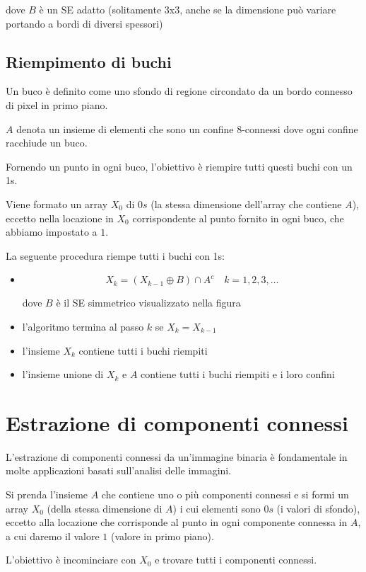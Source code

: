 dove $B$ è un SE adatto (solitamente 3x3, anche se la dimensione può variare portando a bordi di diversi spessori)

\subsection{Riempimento di buchi}
Un buco è definito come uno sfondo di regione circondato da un bordo connesso di pixel in primo piano.

$A$ denota un insieme di elementi che sono un confine 8-connessi dove ogni confine racchiude un buco.

Fornendo un punto in ogni buco, l'obiettivo è riempire tutti questi buchi con un 1s.

Viene formato un array $X_0$ di $0s$ (la stessa dimensione dell'array che contiene $A$), eccetto nella locazione in $X_0$ corrispondente al punto fornito in ogni buco, che abbiamo impostato a $1$.

La seguente procedura riempe tutti i buchi con 1s:
\begin{itemize}
	\item
	$$
	X_k = (X_{k-1} \oplus B) \cap A^c \quad k = 1, 2, 3, \dots
	$$
	
	dove $B$ è il SE simmetrico visualizzato nella figura
	
	\item l'algoritmo termina al passo $k$ se $X_k = X_{k-1}$
	
	\item l'insieme $X_k$ contiene tutti i buchi riempiti
	
	\item l'insieme unione di $X_k$ e $A$ contiene tutti i buchi riempiti e i loro confini
\end{itemize}

\section{Estrazione di componenti connessi}
L'estrazione di componenti connessi da un'immagine binaria è fondamentale in molte applicazioni basati sull'analisi delle immagini.

Si prenda l'insieme $A$ che contiene uno o più componenti connessi e si formi un array $X_0$ (della stessa dimensione di $A$) i cui elementi sono $0s$ (i valori di sfondo), eccetto alla locazione che corrisponde al punto in ogni componente connessa in $A$, a cui daremo il valore $1$ (valore in primo piano).

L'obiettivo è incominciare con $X_0$ e trovare tutti i componenti connessi.

